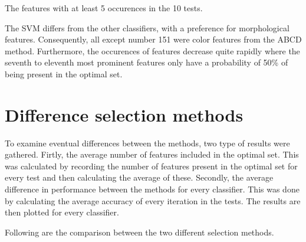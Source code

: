 \documentclass{kththesis}
\begin{document}
\begin{table}[h!]
  \begin{center}
    \caption{The features with at least 5 occurences in the 10 tests.}
  \end{center}
\end{table}

The SVM differs from the other classifiers, with a preference for morphological features. Consequently, all except number 151 were color features from the ABCD method. Furthermore, the occurences of features decrease quite rapidly where the seventh to eleventh most prominent features only have a probability of 50\% of being present in the optimal set. 


\section{Difference selection methods}

To examine eventual differences between the methods, two type of results were gathered. Firtly, the average number of features included in the optimal set. This was calculated by recording the number of features present in the optimal set for every test and then calculating the average of these. Secondly, the average difference in performance between the methods for every classifier. This was done by calculating the average accuracy of every iteration in the tests. The results are then plotted for every classifier. 

Following are the comparison between the two different selection methods. 

\end{document}
